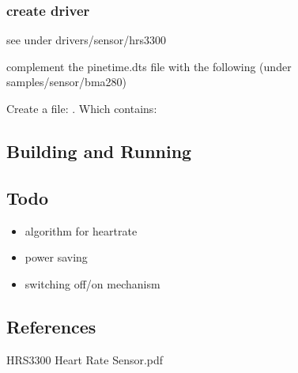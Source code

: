 \documentclass[letterpaper,10pt,english]{sphinxmanual}
\begin{document}
\subsubsection{create driver}
\label{\detokenize{drivers/hrs3300:create-driver}}
see under drivers/sensor/hrs3300

complement the pinetime.dts file with the following (under samples/sensor/bma280)

\begin{sphinxVerbatim}[commandchars=\\\{\}]
\end{sphinxVerbatim}

Create a file: .
Which contains:

\begin{sphinxVerbatim}[commandchars=\\\{\}]
 
\end{sphinxVerbatim}


\subsection{Building and Running}
\label{\detokenize{drivers/hrs3300:building-and-running}}

\subsection{Todo}
\label{\detokenize{drivers/hrs3300:todo}}\begin{itemize}
\item {} 
algorithm for heartrate

\item {} 
power saving

\item {} 
switching off/on mechanism

\end{itemize}


\subsection{References}
\label{\detokenize{drivers/hrs3300:references}}
HRS3300 Heart Rate Sensor.pdf
\end{document}
